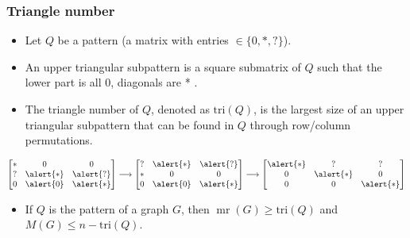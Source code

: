 \documentclass{beamer}
\def \mr {\operatorname{mr}}
\begin{document}
\begin{frame}
\frametitle{Triangle number}
\begin{itemize}
\item Let $Q$ be a pattern (a matrix with entries $\in\{0, * , ?\}$).
\item An upper triangular subpattern is a square submatrix of $Q$ such that the lower part is all \alert{$0$}, diagonals are \alert{ * }.
\item The \alert{triangle number} of $Q$, denoted as $\text{tri}(Q)$, is the largest size of an upper triangular subpattern that can be found in $Q$ through row/column permutations.
\end{itemize}

\[
\begin{bmatrix}
    * & 0 & 0 \\
    ? & \alert{*} & \alert{?} \\
    0 & \alert{0} & \alert{*} \\ 
\end{bmatrix}
\longrightarrow 
\begin{bmatrix}
    ? & \alert{*} & \alert{?} \\
    * & 0 & 0 \\
    0 & \alert{0} & \alert{*} \\
\end{bmatrix}
\longrightarrow 
\begin{bmatrix}
    \alert{*} & ? & ? \\
    0 & \alert{*} & 0 \\
    0 & 0 & \alert{*} \\
\end{bmatrix}
\]
\begin{itemize}
\item If $Q$ is the pattern of a graph $G$, then $\mr(G)\geq \text{tri}(Q)$ and $M(G)\leq n-\text{tri}(Q)$.
\end{itemize}
\end{frame}

\end{document}

